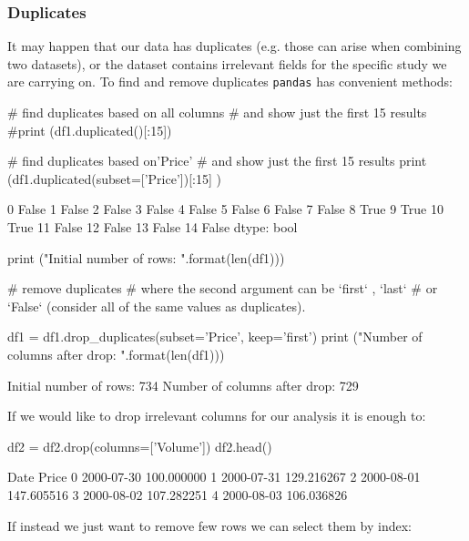 \subsubsection{Duplicates}

It may happen that our data has duplicates (e.g. those can arise when combining two datasets), or the dataset contains irrelevant fields for the specific study we are carrying on. To find and remove duplicates \texttt{pandas} has convenient methods:

\begin{ipython}
# find duplicates based on all columns
# and show just the first 15 results
#print (df1.duplicated()[:15])

# find duplicates based on'Price'
# and show just the first 15 results
print (df1.duplicated(subset=['Price'])[:15] )
\end{ipython}
\begin{ioutput}
0     False
1     False
2     False
3     False
4     False
5     False
6     False
7     False
8      True
9      True
10     True
11    False
12    False
13    False
14    False
dtype: bool
\end{ioutput}

\begin{ipython}
print ("Initial number of rows: {}".format(len(df1)))

# remove duplicates
# where the second argument can be `first` , `last`
# or `False` (consider all of the same values as duplicates).

df1 = df1.drop_duplicates(subset='Price', keep='first')
print ("Number of columns after drop: {}".format(len(df1)))
\end{ipython}
\begin{ioutput}
Initial number of rows: 734
Number of columns after drop: 729
\end{ioutput}

If we would like to drop irrelevant columns for our analysis it is enough to:

\begin{ipython}
df2 = df2.drop(columns=['Volume'])
df2.head()
\end{ipython}
\begin{ioutput}
         Date       Price
0  2000-07-30  100.000000
1  2000-07-31  129.216267
2  2000-08-01  147.605516
3  2000-08-02  107.282251
4  2000-08-03  106.036826
\end{ioutput}
        
If instead we just want to remove few rows we can select them by index:

